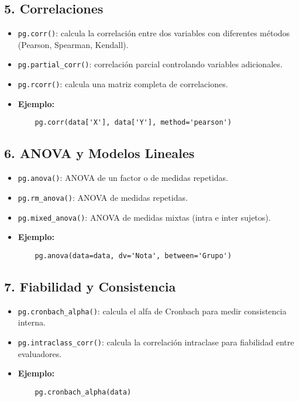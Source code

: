 \documentclass[12pt,a4paper]{article}
\begin{document}
\subsection{5. Correlaciones}
\begin{itemize}
    \item \texttt{pg.corr()}: calcula la correlación entre dos variables con diferentes métodos (Pearson, Spearman, Kendall).
    \item \texttt{pg.partial\_corr()}: correlación parcial controlando variables adicionales.
    \item \texttt{pg.rcorr()}: calcula una matriz completa de correlaciones.
    \item \textbf{Ejemplo:}
    \begin{verbatim}
    pg.corr(data['X'], data['Y'], method='pearson')
    \end{verbatim}
\end{itemize}

\subsection{6. ANOVA y Modelos Lineales}
\begin{itemize}
    \item \texttt{pg.anova()}: ANOVA de un factor o de medidas repetidas.
    \item \texttt{pg.rm\_anova()}: ANOVA de medidas repetidas.
    \item \texttt{pg.mixed\_anova()}: ANOVA de medidas mixtas (intra e inter sujetos).
    \item \textbf{Ejemplo:}
    \begin{verbatim}
    pg.anova(data=data, dv='Nota', between='Grupo')
    \end{verbatim}
\end{itemize}

\subsection{7. Fiabilidad y Consistencia}
\begin{itemize}
    \item \texttt{pg.cronbach\_alpha()}: calcula el alfa de Cronbach para medir consistencia interna.
    \item \texttt{pg.intraclass\_corr()}: calcula la correlación intraclase para fiabilidad entre evaluadores.
    \item \textbf{Ejemplo:}
    \begin{verbatim}
    pg.cronbach_alpha(data)
    \end{verbatim}
\end{itemize}
\end{document}
